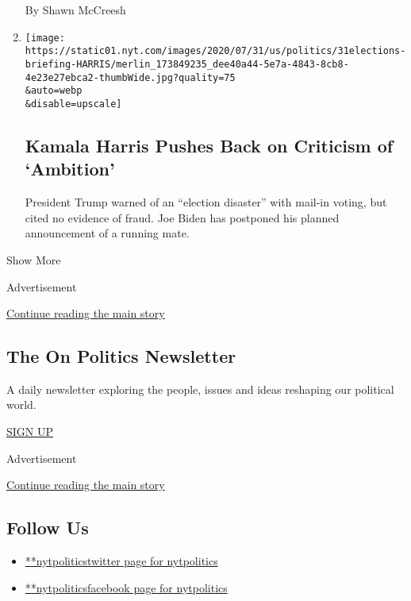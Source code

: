 \begin{enumerate}
  By Shawn McCreesh
\item
  \href{/2020/07/31/us/elections/biden-vs-trump.html}{}

  \texttt{[image: https://static01.nyt.com/images/2020/07/31/us/politics/31elections-briefing-HARRIS/merlin\_173849235\_dee40a44-5e7a-4843-8cb8-4e23e27ebca2-thumbWide.jpg?quality=75\\\&auto=webp\\\&disable=upscale]}

  \hypertarget{kamala-harris-pushes-back-on-criticism-of-ambition}{%
  \subsection{Kamala Harris Pushes Back on Criticism of
  `Ambition'}\label{kamala-harris-pushes-back-on-criticism-of-ambition}}

  President Trump warned of an ``election disaster'' with mail-in
  voting, but cited no evidence of fraud. Joe Biden has postponed his
  planned announcement of a running mate.
\end{enumerate}

Show More

Advertisement

\protect\hyperlink{after-mid2}{Continue reading the main story}

\hypertarget{the-on-politics-newsletter}{%
\subsection{The On Politics
Newsletter}\label{the-on-politics-newsletter}}

A daily newsletter exploring the people, issues and ideas reshaping our
political world.

\href{/newsletters/signup/CN}{SIGN UP}

Advertisement

\protect\hyperlink{after-mktg}{Continue reading the main story}

\hypertarget{follow-us}{%
\subsection{Follow Us}\label{follow-us}}

\begin{itemize}
\tightlist
\item
  \href{https://twitter.com/nytpolitics}{**nytpoliticstwitter page for
  nytpolitics}
\item
  \href{https://www.facebook.com/nytpolitics}{**nytpoliticsfacebook page
  for nytpolitics}
\end{itemize}

